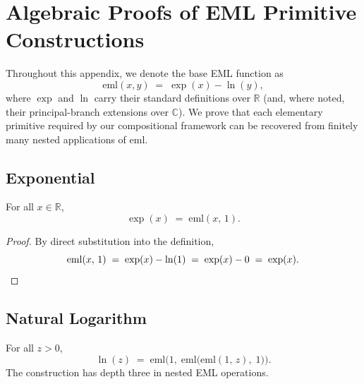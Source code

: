 
\section{Algebraic Proofs of EML Primitive Constructions}
\label{appendix:algebraic-proofs}

Throughout this appendix, we denote the base EML function as
\begin{equation}
    \mathrm{eml}(x, y) \;=\; \exp(x) - \ln(y),
\end{equation}
where $\exp$ and $\ln$ carry their standard definitions over $\mathbb{R}$ (and, where noted, their principal-branch extensions over $\mathbb{C}$).  We prove that each elementary primitive required by our compositional framework can be recovered from finitely many nested applications of $\mathrm{eml}$.

\subsection{Exponential}
\label{sec:proof-exp}

\begin{proposition}
For all $x \in \mathbb{R}$,
\[
    \exp(x) \;=\; \mathrm{eml}(x,\, 1).
\]
\end{proposition}

\begin{proof}
By direct substitution into the definition,
\[
    \mathrm{eml}(x,\, 1)
    \;=\; \exp(x) - \ln(1)
    \;=\; \exp(x) - 0
    \;=\; \exp(x). \qedhere
\]
\end{proof}

\subsection{Natural Logarithm}
\label{sec:proof-ln}

\begin{proposition}
For all $z > 0$,
\[
    \ln(z) \;=\; \mathrm{eml}\!\Big(1,\;\mathrm{eml}\!\big(\mathrm{eml}(1,\, z),\; 1\big)\Big).
\]
The construction has depth three in nested EML operations.
\end{proposition}

